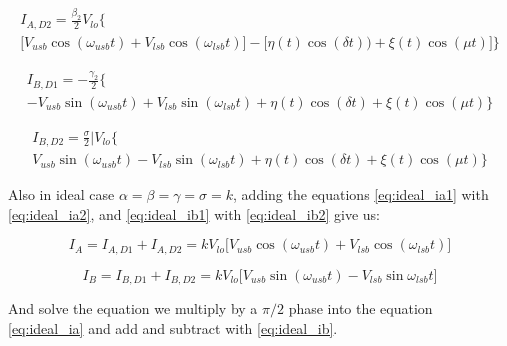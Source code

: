 \vspace{0.5cm}

\begin{equation}
    \label{eq:ideal_ia2}
    \begin{gathered}
    I_{A,D2} = \frac{\beta_{2}}{2} V_{lo} \big\{ \\
    \big[ 
    V_{usb}\cos(\omega_{usb}t)+V_{lsb}\cos(\omega_{lsb}t) \big] - 
    \big[ \eta(t)\cos(\delta t))+\xi(t)\cos(\mu t) \big]
    \big\}
    \end{gathered}
\end{equation}

\vspace{0.5cm}

\begin{equation}
\label{eq:ideal_ib1}
    \begin{gathered}
    I_{B,D1} = -\frac{\gamma_{2}}{2}\big\{ \\
    -V_{usb}\sin(\omega_{usb}t)+V_{lsb}\sin(\omega_{lsb}t) +
    \eta(t)\cos(\delta t) + \xi(t)\cos(\mu t)
    \big\}
    \end{gathered}
\end{equation}

\vspace{0.5cm}
\begin{equation}
\label{eq:ideal_ib2}
    \begin{gathered}
     I_{B,D2} = \frac{\sigma}{2}|V_{lo} \big\{ \\
    V_{usb}\sin(\omega_{usb}t)-
    V_{lsb}\sin(\omega_{lsb}t)+
    \eta(t)\cos(\delta t) +
    \xi(t)\cos(\mu t)
    \big\}
    \end{gathered}
\end{equation}


Also in ideal case $\alpha=\beta=\gamma=\sigma=k$, adding the equations \ref{eq:ideal_ia1} with \ref{eq:ideal_ia2}, and \ref{eq:ideal_ib1} with \ref{eq:ideal_ib2} give us:

\begin{equation}
    \label{eq:ideal_ia}
    I_{A} = I_{A,D1}+I_{A,D2} = kV_{lo}\big[ V_{usb}\cos(\omega_{usb}t)+V_{lsb}\cos(\omega_{lsb}t) ]
\end{equation}

\begin{equation}
    \label{eq:ideal_ib}
    I_{B} = I_{B,D1}+I_{B,D2} = kV_{lo} \big[
    V_{usb}\sin(\omega_{usb}t)-V_{lsb}\sin{\omega_{lsb}t}
    \big]
\end{equation}

And solve the equation we multiply by a $\pi/2$ phase into the equation \ref{eq:ideal_ia} and add and subtract with \ref{eq:ideal_ib}.


